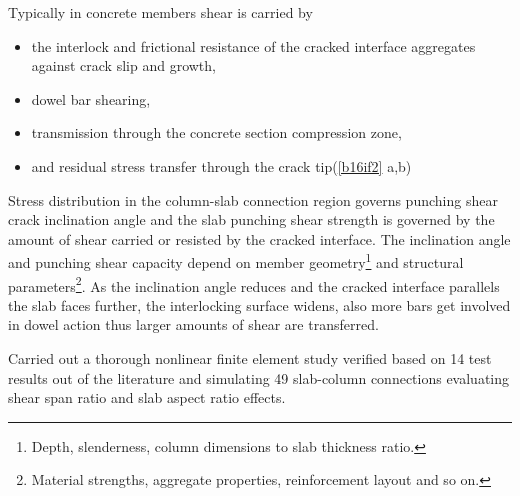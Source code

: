 Typically in concrete members shear is carried by \begin{itemize}\item the interlock and frictional resistance of the cracked interface aggregates against crack slip and growth\citep{walraven1981}, \item dowel bar shearing\citep{dei1987,dei1992,ince2007,paulay1974,taylor1970}, \item transmission through the concrete section compression zone\citep{chana1987}, \item and residual stress transfer through the crack tip(\ref{b16if2} a,b)
\end{itemize}
Stress distribution in the column-slab connection region governs punching shear crack inclination angle and the slab punching shear strength is governed by the amount of shear carried or resisted by the cracked interface. The inclination angle and punching shear capacity depend on member geometry\footnote{Depth, slenderness, column dimensions to slab thickness ratio.} and structural parameters\footnote{Material strengths, aggregate properties, reinforcement layout and so on.}. As the inclination angle reduces and the cracked interface parallels the slab faces further, the interlocking surface widens, also more bars get involved in dowel action thus larger amounts of shear are transferred. 


\cite{zheng2023} Carried out a thorough nonlinear finite element study verified based on 14 test results out of the literature and simulating 49 slab-column connections evaluating shear span ratio and slab aspect ratio effects.

